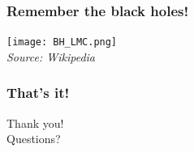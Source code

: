 \documentclass{beamer}
\begin{document}
\addtocounter{page}{1}
\begin{frame}
\addtocounter{page}{-1}
\frametitle{Remember the black holes!}

\begin{center}
\texttt{[image: BH\_LMC.png]}%
\\
\textit{\footnotesize{Source: Wikipedia}}
\end{center}

\end{frame}



\addtocounter{page}{1}
\begin{frame}
\addtocounter{page}{-1}
\frametitle{That's it!}
\begin{center}
Thank you!\\
Questions?
\end{center}
\end{frame}



%
\end{document}
